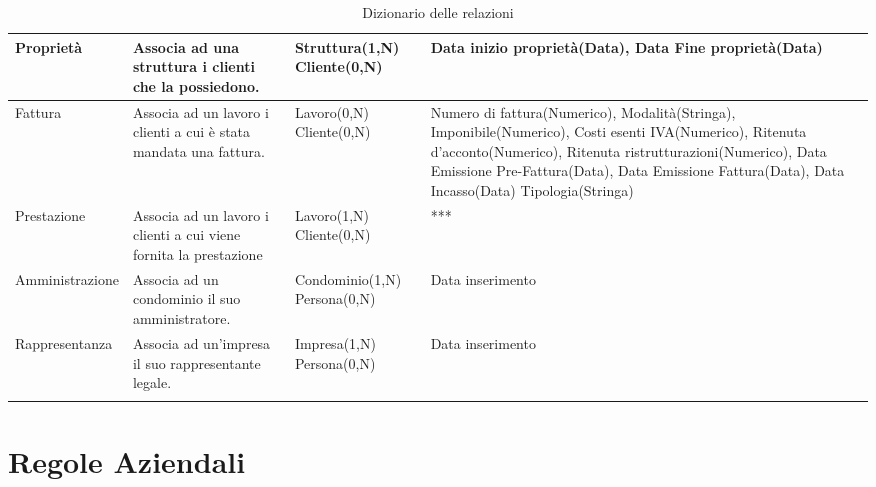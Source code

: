 \documentclass{elegantbook}
\begin{document}
\begin{longtable}{|p{2.5cm}|p{5cm}|p{3.8cm}|p{4.7cm}|}
            \hline
            Proprietà
		& Associa ad una struttura i clienti che la possiedono.
		& Struttura(1,N) 
		\newline Cliente(0,N) 
                & Data inizio proprietà(Data),
                Data Fine proprietà(Data)\\
            \hline
            Fattura
		& Associa ad un lavoro i clienti a cui è stata mandata una fattura.
		& Lavoro(0,N) 
		\newline Cliente(0,N) 
                & Numero di fattura(Numerico),
                 Modalità(Stringa),
                 Imponibile(Numerico),
                 Costi esenti IVA(Numerico),
                 Ritenuta d'acconto(Numerico),
                 Ritenuta ristrutturazioni(Numerico),
                 Data Emissione Pre-Fattura(Data),
                 Data Emissione Fattura(Data),
                 Data Incasso(Data)
                 Tipologia(Stringa) \\
            \hline
            Prestazione
		& Associa ad un lavoro i clienti a cui viene fornita la prestazione 
		& Lavoro(1,N) 
		\newline Cliente(0,N) 
		& ***\\
            \hline
            Amministrazione
		& Associa ad un condominio il suo amministratore.
		& Condominio(1,N) 
		\newline Persona(0,N) 
		& Data inserimento\\
            \hline
            Rappresentanza
		& Associa ad un'impresa il suo rappresentante legale.
		& Impresa(1,N) 
		\newline Persona(0,N)
		& Data inserimento\\
            \hline
            \caption{Dizionario delle relazioni}
	\end{longtable}
        \newpage
	\section{Regole Aziendali}
\end{document}
